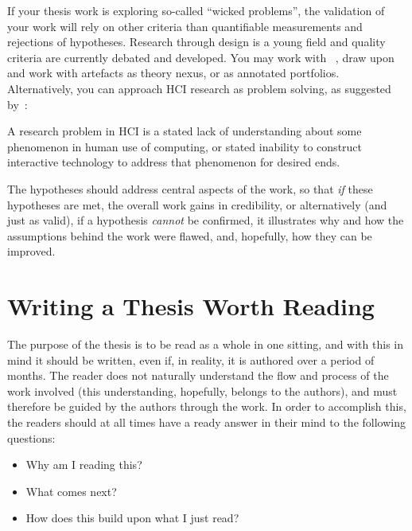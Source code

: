 If your thesis work is exploring so-called ``wicked problems'', the validation
of your work will rely on other criteria than quantifiable measurements and
rejections of hypotheses.  Research through design is a young field and
quality criteria are currently debated and developed. You may work with
\citeauthor{Zimmerman2007:POTSCOHFICS2007}~\cite{Zimmerman2007:POTSCOHFICS2007}, draw upon
\citeauthor{Gaver2012:POTSCOHFICS2012}~\cite{Gaver2012:POTSCOHFICS2012} and work with artefacts as theory
nexus, or as annotated portfolios. Alternatively, you can approach HCI
research as problem solving, as suggested by~\citeauthor{Oulasvirta2016:POT2CCOHFICS2016}:

\begin{displayquote}
  A research problem in HCI is a stated lack of understanding about some
  phenomenon in human use of computing, or stated inability to construct
  interactive technology to address that phenomenon for desired
  ends.
\end{displayquote}


The hypotheses should address central aspects of the work, so that \emph{if}
these hypotheses are met, the overall work gains in credibility, or
alternatively (and just as valid), if a hypothesis \emph{cannot} be
confirmed, it illustrates why and how the assumptions behind the work were
flawed, and, hopefully, how they can be improved.



\section{Writing a Thesis Worth Reading}
\label{sec:writ-thes-read}

The purpose of the thesis is to be read as a whole in one sitting, and with
this in mind it should be written, even if, in reality, it is authored over
a period of months.  The reader does not naturally understand the flow and
process of the work involved (this understanding, hopefully, belongs to the
authors), and must therefore be guided by the authors through the work.  In
order to accomplish this, the readers should at all times have a ready
answer in their mind to the following questions:

\begin{itemize}
\item Why am I reading this?
\item What comes next?
\item How does this build upon what I just read?
\end{itemize}

